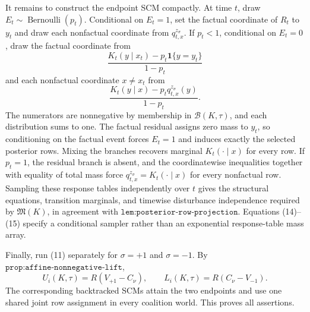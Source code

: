 It remains to construct the endpoint SCM compactly.  At time \(t\), draw \(E_t\sim\operatorname{Bernoulli}(p_t)\).  Conditional on \(E_t=1\), set the factual coordinate of \(R_t\) to \(y_t\) and draw each nonfactual coordinate from \(q^{z_\sigma}_{t,x}\).  If \(p_t<1\), conditional on \(E_t=0\), draw the factual coordinate from
\[
 \frac{K_t(y\mid x_t)-p_t\mathbf 1\{y=y_t\}}{1-p_t}
 \tag{14}
\]
and each nonfactual coordinate \(x\ne x_t\) from
\[
 \frac{K_t(y\mid x)-p_tq^{z_\sigma}_{t,x}(y)}{1-p_t}.
 \tag{15}
\]
The numerators are nonnegative by membership in \(\mathcal B(K,\tau)\), and each distribution sums to one.  The factual residual assigns zero mass to \(y_t\), so conditioning on the factual event forces \(E_t=1\) and induces exactly the selected posterior rows.  Mixing the branches recovers marginal \(K_t(\cdot\mid x)\) for every row.  If \(p_t=1\), the residual branch is absent, and the coordinatewise inequalities together with equality of total mass force \(q^{z_\sigma}_{t,x}=K_t(\cdot\mid x)\) for every nonfactual row.  Sampling these response tables independently over \(t\) gives the structural equations, transition marginals, and timewise disturbance independence required by \(\mathfrak M(K)\), in agreement with \(\texttt{lem:posterior-row-projection}\).  Equations (14)--(15) specify a conditional sampler rather than an exponential response-table mass array.

Finally, run (11) separately for \(\sigma=+1\) and \(\sigma=-1\).  By \(\texttt{prop:affine-nonnegative-lift}\),
\[
 U_i(K,\tau)=R(V_{+1}-C_\nu),
 \qquad
 L_i(K,\tau)=R(C_\nu-V_{-1}).
\]
The corresponding backtracked SCMs attain the two endpoints and use one shared joint row assignment in every coalition world.  This proves all assertions.